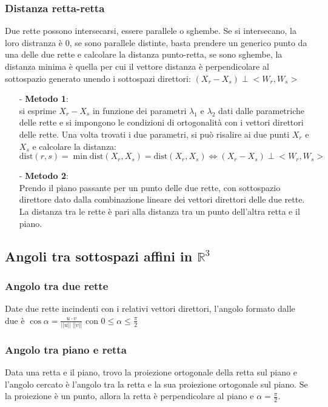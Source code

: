 \documentclass[a4paper]{article}
\newcommand\dist{\text{dist}}	%
\begin{document}
\subsubsection*{Distanza retta-retta}
Due rette possono intersecarsi, essere parallele o sghembe. Se si intersecano, la loro distranza è 0, se sono parallele distinte,
basta prendere un generico punto da una delle due rette e calcolare la distanza punto-retta, se sono sghembe, la distanza minima
è quella per cui il vettore distanza è perpendicolare al sottospazio generato unendo i sottospazi direttori: \((X_r-X_s) \perp <W_r, W_s>\)
\begin{itemize}[topsep=3pt, itemsep=0pt]
	\item[-] \textbf{Metodo 1}: \\
	si esprime \(X_r-X_s\) in funzione dei parametri \(\lambda_1\) e \(\lambda_2\) dati dalle parametriche delle rette e si impongono
	le condizioni di ortogonalità con i vettori direttori delle rette. Una volta trovati i due parametri, si può risalire ai due
	punti \(X_r\) e \(X_s\) e calcolare la distanza: \(\dist(r,s) = \min \dist(X_r, X_s) = \dist(X_r, X_s) \Leftrightarrow (X_r-X_s) \perp <W_r, W_s>\)
	\item[-] \textbf{Metodo 2}: \\
	Prendo il piano passante per un punto delle due rette, con sottospazio direttore dato dalla combinazione lineare dei vettori
	direttori delle due rette. La distanza tra le rette è pari alla distanza tra un punto dell'altra retta e il piano.
\end{itemize}

\subsection{Angoli tra sottospazi affini in \(\mathbb{R}^3\)}
\subsubsection*{Angolo tra due rette}
Date due rette incindenti con i relativi vettori direttori, l'angolo formato dalle due è \(\displaystyle \cos \alpha = \frac{u \cdot v}{||u|| \; ||v||}\)
con \(0 \leq \alpha \leq \frac{\pi}{2}\)

\subsubsection*{Angolo tra piano e retta}
Data una retta e il piano, trovo la proiezione ortogonale della retta sul piano e l'angolo cercato è l'angolo tra la retta e la sua
proiezione ortogonale sul piano. Se la proiezione è un punto, allora la retta è perpendicolare al piano e \(\alpha = \frac{\pi}{2}\).
\end{document}
